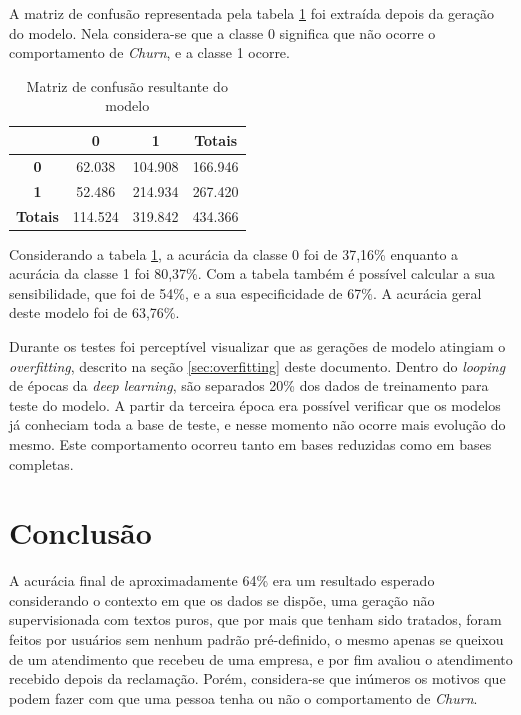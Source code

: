 \documentclass[12pt]{article}
\begin{document}
A matriz de confusão representada pela tabela \ref{tab:confusion} foi extraída depois da geração do modelo. Nela considera-se que a classe 0 significa que não ocorre o comportamento de \emph{Churn}, e a classe 1 ocorre.

\begin{table}[H]
\centering
\caption{Matriz de confusão resultante do modelo} 
\label{tab:confusion}
\begin{tabular}{|c|c|c|c|}
\hline
\textbf{} & \textbf{0} & \textbf{1} & \textbf{Totais} \\ \hline
\textbf{0} & 62.038 & 104.908 & 166.946 \\ \hline
\textbf{1} & 52.486 & 214.934 & 267.420 \\ \hline
\textbf{Totais} & 114.524 & 319.842 & 434.366 \\ \hline
\end{tabular}
\end{table}

Considerando a tabela \ref{tab:confusion}, a acurácia da classe 0 foi de 37,16\% enquanto a acurácia da classe 1 foi 80,37\%. Com a tabela também é possível calcular a sua sensibilidade, que foi de 54\%, e a sua especificidade de 67\%. A acurácia geral deste modelo foi de 63,76\%.

Durante os testes foi perceptível visualizar que as gerações de modelo atingiam o \emph{overfitting}, descrito na seção \ref{sec:overfitting} deste documento. Dentro do \emph{looping} de épocas da \emph{deep learning}, são separados 20\% dos dados de treinamento para teste do modelo. A partir da terceira época era possível verificar que os modelos já conheciam toda a base de teste, e nesse momento não ocorre mais evolução do mesmo. Este comportamento ocorreu tanto em bases reduzidas como em bases completas.  

\section{Conclusão}\label{sec:conclusion}

A acurácia final de aproximadamente 64\% era um resultado esperado considerando o contexto em que os dados se dispõe, uma geração não supervisionada com textos puros, que por mais que tenham sido tratados, foram feitos por usuários sem nenhum padrão pré-definido, o mesmo apenas se queixou de um atendimento que recebeu de uma empresa, e por fim avaliou o atendimento recebido depois da reclamação. Porém, considera-se que inúmeros os motivos que podem fazer com que uma pessoa tenha ou não o comportamento de \emph{Churn}. 
\end{document}
